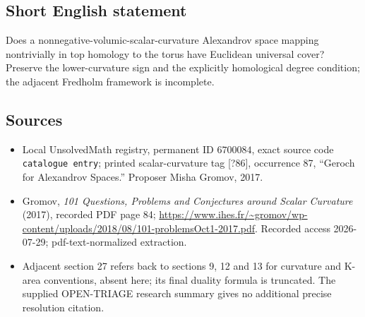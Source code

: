 \documentclass[11pt]{article}
\begin{document}
\subsection{Short English statement}
Does a nonnegative-volumic-scalar-curvature Alexandrov space mapping nontrivially in top homology to the torus have Euclidean universal cover? Preserve the lower-curvature sign and the explicitly homological degree condition; the adjacent Fredholm framework is incomplete.
\subsection{Sources}
\begin{itemize}
\item Local UnsolvedMath registry, permanent ID \(6700084\), exact source code \texttt{catalogue entry}; printed scalar-curvature tag [?86], occurrence 87, ``Geroch for Alexandrov Spaces.'' Proposer Misha Gromov, 2017.
\item Gromov, \emph{101 Questions, Problems and Conjectures around Scalar Curvature} (2017), recorded PDF page 84; \url{https://www.ihes.fr/~gromov/wp-content/uploads/2018/08/101-problemsOct1-2017.pdf}. Recorded access 2026-07-29; pdf-text-normalized extraction.
\item Adjacent section 27 refers back to sections 9, 12 and 13 for curvature and K-area conventions, absent here; its final duality formula is truncated. The supplied OPEN-TRIAGE research summary gives no additional precise resolution citation.
\end{itemize}
\end{document}
